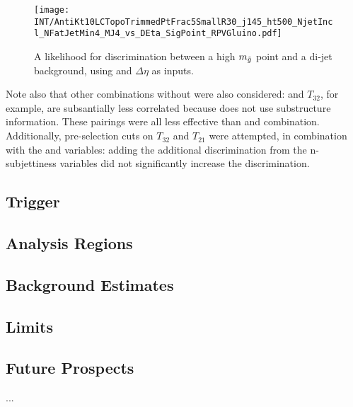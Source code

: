 

\begin{figure}
\centering
\texttt{[image: INT/AntiKt10LCTopoTrimmedPtFrac5SmallR30\_j145\_ht500\_NjetIncl\_NFatJetMin4\_MJ4\_vs\_DEta\_SigPoint\_RPVGluino.pdf]}
\label{fig:search:search:optimization:2D:DETAraw}
\caption{A likelihood for discrimination between a high $m_{\tilde{g}}$ point and a \herwigpp di-jet background, using \MJ and $\Delta \eta$ as inputs.}
\end{figure}



Note also that other combinations without \MJ were also considered: \Ht and $T_{32}$, for example, are subsantially less correlated because \Ht does not use substructure information. These pairings were all less effective than \MJ and \Deta combination. Additionally, pre-selection cuts on $T_{32}$ and $T_{21}$ were attempted, in combination with the \MJ and \Deta variables: adding the additional discrimination from the n-subjettiness variables did not significantly increase the discrimination.


	\subsection{Trigger}
	\subsection{Analysis Regions}
	\label{chapter:search:search:regions}
	\subsection{Background Estimates}
	\label{chapter:search:search:background}
	\subsection{Limits}
	\subsection{Future Prospects}
		...